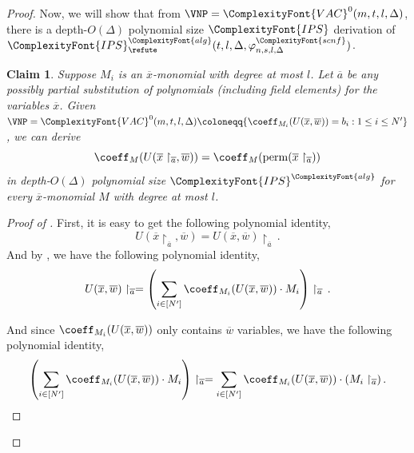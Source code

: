 \documentclass[11pt,letter]{article}
\newtheorem{claim}[theorem]{Claim}
\theoremstyle{remark} %
\newcommand{\perm}{{\rm perm}}
\newcommand{\alg}{\ComplexityFont{alg}}
\newcommand{\IPS}{%
    {
        \ComplexityFont{IPS} 
    }
}
\newcommand{\scnf}{
    {
        \ComplexityFont{scnf}
    }
}
\newcommand{\VAC}{
    {
        \ComplexityFont{VAC}
    }
}
\begin{document}
{\begin{proof}
        \bigskip
        \bigskip

    Now, we will show that from $\VNP = \VAC^0(m,t,l,\Delta)$, there is a depth-$O(\Delta)$ polynomial size $\IPS$ derivation of $\IPS_\refute^\alg(t,l,\Delta, \varphi_{n,s,l,\Delta}^\scnf)$.


    \begin{claim}
        \label{claim: main part of GP in IPS}
        Suppose $M_i$ is an $\overline{x}$-monomial with degree at most $l$. Let $\overline{a}$ be any possibly partial substitution of polynomials (including field elements) for the variables $\overline{x}$. Given $\VNP = \VAC^0(m,t,l,\Delta) \coloneqq \{\coeff_{M_i} (U(\overline{x},\overline{w})) = b_i : 1\leq i \leq N^\prime\}$, we can derive
        \begin{equation}
            \coeff_M(U(\overline{x}\restriction_{\overline{a}}, \overline{w})) = \coeff_M(\perm(\overline{x}\restriction_{\overline{a}}))
        \end{equation}
        in depth-$O(\Delta)$ polynomial size $\IPS^\alg$ for every $\overline{x}$-monomial $M$ with degree at most $l$.
    \end{claim}

    \begin{proof}[Proof of ]
        First, it is easy to get the following polynomial identity,
    \begin{equation}
        \label{equa: assignment can be taken out}            U(\overline{x}\restriction_{\overline{a}}, \overline{w}) = U(\overline{x},\overline{w})\restriction_{\overline{a}} \,.
    \end{equation}
    And by , we have the following polynomial identity,
    \begin{equation}
        \label{equa: by definition 1}
        U(\overline{x},\overline{w})\restriction_{\overline{a}} = 
        \left(
            \sum_{i\in [N^\prime]}    \coeff_{M_i}(U(\overline{x}, \overline{w}))\cdot M_i%
        \right)\restriction_{\overline{a}}\,.
    \end{equation}
    
    And since $\coeff_{M_i}(U(\overline{x},\overline{w}))$ only contains $\overline{w}$ variables, we have the following polynomial identity,
    \begin{equation}
        \label{equa: coeff only have w variables}
        \left (\sum_{i\in [N^\prime]} \coeff_{M_i}(U(\overline{x}, \overline{w})) \cdot M_i \right )\restriction_{\overline{a}} = \sum_{i\in [N^\prime]} \coeff_{M_i}(U(\overline{x}, \overline{w})) \cdot (M_i\restriction_{\overline{a}})\,.
    \end{equation}
    

\end{proof}
\end{proof}}
\end{document}
